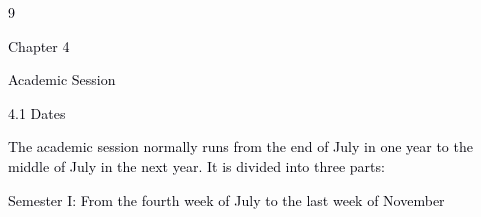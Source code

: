 \documentclass[12pt]{article}
\begin{document}
\vspace{\baselineskip}

\vspace{\baselineskip}

\vspace{\baselineskip}

\vspace{\baselineskip}

\vspace{\baselineskip}

\vspace{\baselineskip}

\vspace{\baselineskip}

\vspace{\baselineskip}

\vspace{\baselineskip}
\begin{Center}
\textcolor[HTML]{00000A}{9}
\end{Center}\par


\vspace{\baselineskip}
{\fontsize{14pt}{16.8pt}\selectfont \textcolor[HTML]{00000A}{Chapter 4}\par}\par


\vspace{\baselineskip}
{\fontsize{20pt}{24.0pt}\selectfont \textcolor[HTML]{00000A}{Academic Session}\par}\par


\vspace{\baselineskip}
\textcolor[HTML]{00000A}{4.1 Dates}\par


\vspace{\baselineskip}
\begin{adjustwidth}{0.0in}{0.19in}
{\fontsize{10pt}{12.0pt}\selectfont \textcolor[HTML]{00000A}{The academic session normally runs from the end of July in one year to the middle of July in the next year. It is divided into three parts:}\par}\par

\end{adjustwidth}


\vspace{\baselineskip}
{\fontsize{10pt}{12.0pt}\selectfont \textcolor[HTML]{00000A}{Semester I: From the fourth week of July to the last week of November}\par}\par
\end{document}
